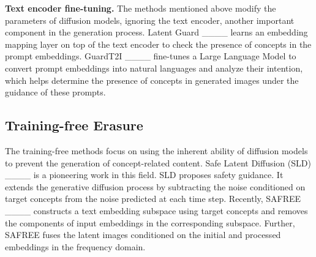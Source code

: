 \textbf{Text encoder fine-tuning.} The methods mentioned above modify the parameters of diffusion models, ignoring the text encoder, another important component in the generation process. Latent Guard ____ learns an embedding mapping layer on top of the text encoder to check the presence of concepts in the prompt embeddings. GuardT2I ____ fine-tunes a Large Language Model to convert prompt embeddings into natural languages and analyze their intention, which helps determine the presence of concepts in generated images under the guidance of these prompts.



\subsection{Training-free Erasure}

The training-free methods focus on using the inherent ability of diffusion models to prevent the generation of concept-related content. Safe Latent Diffusion (SLD) ____ is a pioneering work in this field. SLD proposes safety guidance. It extends the generative diffusion process by subtracting the noise conditioned on target concepts from the noise predicted at each time step. Recently, SAFREE ____ constructs a text embedding subspace using target concepts and removes the components of input embeddings in the corresponding subspace. Further, SAFREE fuses the latent images conditioned on the initial and processed embeddings in the frequency domain.